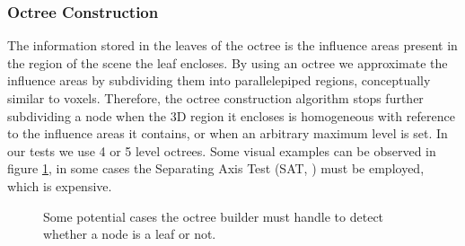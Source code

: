 \documentclass[acmtog, anonymous, review]{acmart}
\begin{document}
\subsubsection{Octree Construction}
The information stored in the leaves of the octree is the influence areas present in the region of the scene the leaf encloses. By using an octree we approximate the influence areas by subdividing them into parallelepiped regions, conceptually similar to voxels. Therefore, the octree construction algorithm stops further subdividing a node when the 3D region it encloses is homogeneous with reference to the influence areas it contains, or when an arbitrary maximum level is set. In our tests we use 4 or 5 level octrees. Some visual examples can be observed in figure \ref{fig:octree_detect_leaf}, in some cases the Separating Axis Test (SAT, \cite{sat}) must be employed, which is expensive.

\begin{figure}[H]
  \quad
  \caption{Some potential cases the octree builder must handle to detect whether a node is a leaf or not.}
  \label{fig:octree_detect_leaf} 
\end{figure}
\end{document}
